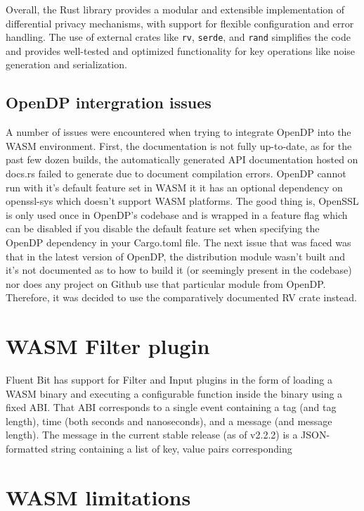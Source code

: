 Overall, the Rust library provides a modular and extensible implementation of differential privacy mechanisms, with support for flexible configuration and error handling. The use of external crates like \texttt{rv}, \texttt{serde}, and \texttt{rand} simplifies the code and provides well-tested and optimized functionality for key operations like noise generation and serialization.

\subsection{OpenDP intergration issues}
A number of issues were encountered when trying to integrate OpenDP into the WASM environment. First, the documentation is not fully up-to-date, as for the past few dozen builds, the automatically generated API documentation hosted on docs.rs failed to generate due to document compilation errors. OpenDP cannot run with it's default feature set in WASM it it has an optional dependency on openssl-sys which doesn't support WASM platforms. The good thing is, OpenSSL is only used once in OpenDP's codebase and is wrapped in a feature flag which can be disabled if you disable the default feature set when specifying the OpenDP dependency in your Cargo.toml file. The next issue that was faced was that in the latest version of OpenDP, the distribution module wasn't built and it's not documented as to how to build it (or seemingly present in the codebase) nor does any project on Github use that particular module from OpenDP. Therefore, it was decided to use the comparatively documented RV crate instead.
\section{WASM Filter plugin}
Fluent Bit has support for Filter and Input plugins in the form of loading a WASM binary and executing a configurable function inside the binary using a fixed ABI. That ABI corresponds to a single \gls{event} containing a tag (and tag length), time (both seconds and nanoseconds), and a message (and message length). The message in the current stable release (as of v2.2.2) is a JSON-formatted string containing a list of key, value pairs corresponding 

\section{WASM limitations}
